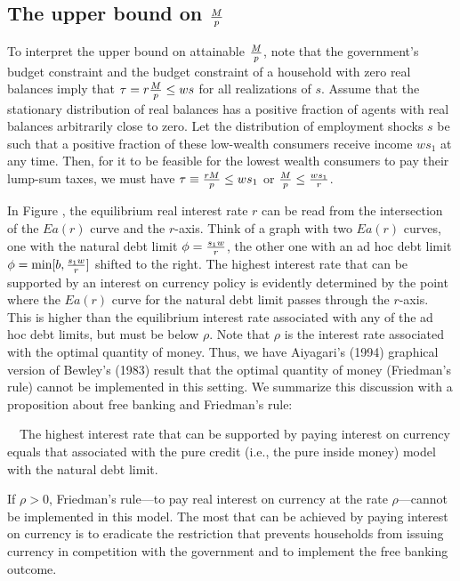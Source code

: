 \subsection{The upper bound on ${M \over p}$}
  To interpret the upper  bound on attainable ${M \over p}$, note that
the government's budget constraint and the budget constraint
of a  household with zero real balances  imply
that $ \tau  = r  {M \over p} \leq  w s $ for all realizations
of $s$.    Assume that the stationary distribution
of real balances has a positive fraction
of agents with real balances arbitrarily close to zero.   Let the
distribution of employment shocks $s$  be such that a positive
fraction of these low-wealth consumers receive income $w s_1$ at any
time.   Then, for it to be feasible for the lowest wealth
consumers to pay their lump-sum taxes, we must
have $\tau \equiv {r M \over p} \leq w s_1$ or
 $ {M \over p} \leq { w s_1 \over r} $.
\medskip


In Figure , the equilibrium real interest
rate $r$ can be read from the intersection of the $E  a(r)$ curve and
the $r$-axis.  Think of a graph with two $E a(r)$ curves, one with the
natural debt limit $\phi = {s_1 w \over r}$, the other one with an
ad hoc debt limit $\phi = \min[b, {s_1 w \over r}]$ shifted to the
right.  The highest interest rate that can be supported by an
interest on currency policy is evidently determined by the point where
the $E a(r)$ curve for the natural debt limit passes through the $r$-axis.
This is higher than the equilibrium interest rate associated with any of
the ad hoc debt limits, but must be below $\rho$.  Note that $\rho$ is
the interest rate associated with the  optimal quantity of money.
Thus, we have Aiyagari's (1994) graphical version of Bewley's (1983) result
that the optimal quantity of money (Friedman's rule) cannot be implemented
in this setting.
\medskip
We summarize this discussion with a proposition about free banking and
Friedman's rule:

\medskip
\medskip{}
\ \   The highest interest rate that can be supported by paying interest
on currency equals that associated with the pure credit (i.e., the pure inside money)
model with the natural debt limit.

\medskip

 If $\rho >0$, Friedman's rule---to pay real interest on
currency at the rate $\rho$---cannot be implemented in this
model.   The most that can be achieved by paying interest
on currency   is to
eradicate the restriction  that prevents households from
issuing currency in competition with the government and
to implement the free banking outcome.

